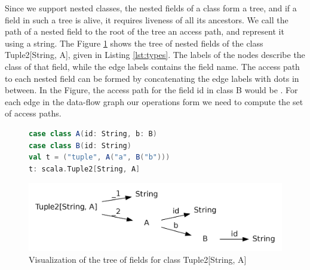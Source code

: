Since we support nested classes, the nested fields of a class form a tree, and if a field in such a tree is alive, it requires liveness of all its ancestors. We call the path of a nested field to the root of the tree an access path, and represent it using a string. The Figure \ref{fig:type_tree} shows the tree of nested fields of the class Tuple2[String, A], given in Listing \ref{lst:types}. The labels of the nodes describe the class of that field, while the edge labels contains the field name. The access path to each nested field can be formed by concatenating the edge labels with dots in between. In the Figure, the access path for the field id in class B would be . For each edge in the data-flow graph our operations form we need to compute the set of access paths.

\begin{figure}
\begin{lstlisting}[language=Scala,name=code, caption=Nested type for paths example., captionpos=b, label=lst:types]
case class A(id: String, b: B)
case class B(id: String)  
val t = ("tuple", A("a", B("b"))) 
t: scala.Tuple2[String, A]
\end{lstlisting}
\centering
\includegraphics[clip=true, width=0.95\columnwidth]{dot/access.png}
\caption{Visualization of the tree of fields for class Tuple2[String, A]}
\label{fig:type_tree}
\end{figure}


